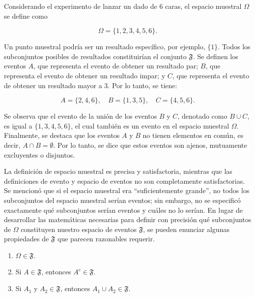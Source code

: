 \documentclass[
  us-letterpaper,
]{scrreprt}
\theoremstyle{plain}
\theoremstyle{definition}
\theoremstyle{definition}
\theoremstyle{plain}
\theoremstyle{remark}
\begin{document}
\begin{tcolorbox}[enhanced jigsaw, bottomtitle=1mm, coltitle=black, breakable, leftrule=.75mm, left=2mm, rightrule=.15mm, titlerule=0mm, toprule=.15mm, toptitle=1mm, colback=white, colframe=quarto-callout-caution-color-frame, title={Ejemplo (\textbf{\emph{Lanzamiento de un dado}})}, colbacktitle=quarto-callout-caution-color!10!white, arc=.35mm, bottomrule=.15mm, opacitybacktitle=0.6, opacityback=0]

Considerando el experimento de lanzar un dado de \(6\) caras, el espacio
muestral \(\Omega\) se define como

\[ \Omega = \{1,2,3,4,5,6\}. \]

Un punto muestral podría ser un resultado específico, por ejemplo,
\(\{1\}\). Todos los subconjuntos posibles de resultados constituirían
el conjunto \(\mathfrak{F}\). Se definen los eventos \(A\), que
representa el evento de obtener un resultado par; \(B\), que representa
el evento de obtener un resultado impar; y \(C\), que representa el
evento de obtener un resultado mayor a 3. Por lo tanto, se tiene:

\[ A= \{2,4,6\},\quad B=\{1,3,5\},\quad C=\{4,5,6\}. \]

Se observa que el evento de la unión de los eventos \(B\) y \(C\),
denotado como \(B\cup C\), es igual a \(\{1, 3, 4, 5, 6\}\), el cual
también es un evento en el espacio muestral \(\Omega\). Finalmente, se
destaca que los eventos \(A\) y \(B\) no tienen elementos en común, es
decir, \(A \cap B = \emptyset\). Por lo tanto, se dice que estos eventos
son ajenos, mutuamente excluyentes o disjuntos.

\end{tcolorbox}

La definición de espacio muestral es precisa y satisfactoria, mientras
que las definiciones de evento y espacio de eventos no son completamente
satisfactorias. Se mencionó que si el espacio muestral era
``suficientemente grande'', no todos los subconjuntos del espacio
muestral serían eventos; sin embargo, no se especificó exactamente qué
subconjuntos serían eventos y cuáles no lo serían. En lugar de
desarrollar las matemáticas necesarias para definir con precisión qué
subconjuntos de \(\Omega\) constituyen nuestro espacio de eventos
\(\mathfrak{F}\), se pueden enunciar algunas propiedades de
\(\mathfrak{F}\) que parecen razonables requerir.

\begin{enumerate}
\def\labelenumi{\roman{enumi}.}
\item
  \(\Omega \in \mathfrak{F}\).
\item
  Si \(A\in\mathfrak{F}\), entonces \(A^c\in \mathfrak{F}\).
\item
  Si \(A_1\) y \(A_2\in \mathfrak{F}\), entonces
  \(A_1\cup A_2\in \mathfrak{F}\).
\end{enumerate}
\end{document}
